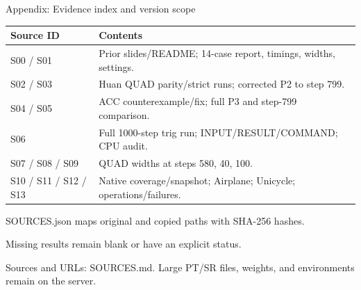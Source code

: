 \documentclass[aspectratio=169,11pt]{beamer}
\newcommand{\src}[1]{\par\vfill{\fontsize{7}{9}\selectfont\color{gray}#1\par}}
\begin{document}
\begin{frame}[t]{Appendix: Evidence index and version scope}
\relax
\relax
{\small\renewcommand{\arraystretch}{1.18}\noindent\begin{tabularx}{\linewidth}{@{}p{3.5cm}X@{}}\toprule
\textbf{Source ID} & \textbf{Contents}\\\midrule
S00 / S01 & Prior slides/README; 14-case report, timings, widths, settings.\\
S02 / S03 & Huan QUAD parity/strict runs; corrected P2 to step 799.\\
S04 / S05 & ACC counterexample/fix; full P3 and step-799 comparison.\\
S06 & Full 1000-step trig run; INPUT/RESULT/COMMAND; CPU audit.\\
S07 / S08 / S09 & QUAD widths at steps 580, 40, 100.\\
S10 / S11 / S12 / S13 & Native coverage/snapshot; Airplane; Unicycle; operations/failures.\\
\bottomrule\end{tabularx}\par{}}\vspace{0.1cm}SOURCES.json maps original and copied paths with SHA-256 hashes.\par{}Missing results remain blank or have an explicit status.
\src{Sources and URLs: SOURCES.md. Large PT/SR files, weights, and environments remain on the server.}
\end{frame}
\end{document}
